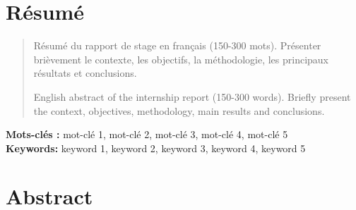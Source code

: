 \section*{Résumé}
\begin{abstract}
    Résumé du rapport de stage en français (150-300 mots). 
    Présenter brièvement le contexte, les objectifs, la méthodologie, les principaux résultats et conclusions.\par
    English abstract of the internship report (150-300 words).
    Briefly present the context, objectives, methodology, main results and conclusions.\\
\end{abstract}
\textbf{Mots-clés :} mot-clé 1, mot-clé 2, mot-clé 3, mot-clé 4, mot-clé 5\\
\textbf{Keywords:} keyword 1, keyword 2, keyword 3, keyword 4, keyword 5

\section*{Abstract}
    
    
\newpage